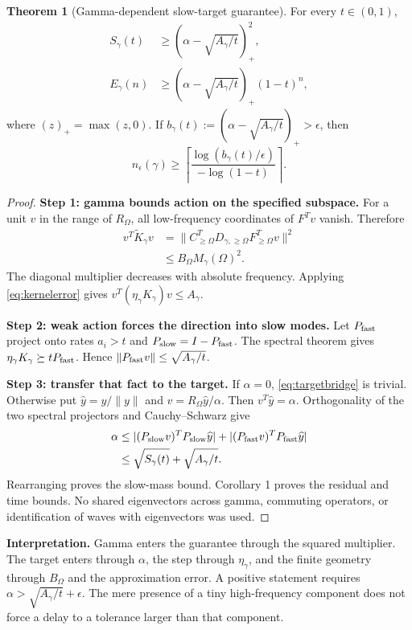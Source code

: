 \documentclass[11pt]{article}
\theoremstyle{definition}
\newtheorem{theorem}{Theorem}
\begin{document}
\begin{theorem}[Gamma-dependent slow-target guarantee]
For every $t\in(0,1)$,
\begin{equation}\label{eq:targetbridge}
 \boxed{\begin{aligned}
 S_\gamma(t)&\ge(\alpha-\sqrt{A_\gamma/t})_+^2,\\
 E_\gamma(n)&\ge(\alpha-\sqrt{A_\gamma/t})_+(1-t)^n,
 \end{aligned}}
\end{equation}
where $(z)_+=\max(z,0)$. If $b_\gamma(t):=(\alpha-\sqrt{A_\gamma/t})_+>\epsilon$,
then
\begin{equation}\label{eq:targettime}
 \boxed{n_\epsilon(\gamma)\ge\left\lceil
 \frac{\log(b_\gamma(t)/\epsilon)}{-\log(1-t)}\right\rceil.}
\end{equation}
\end{theorem}
\begin{proof}
\textbf{Step 1: gamma bounds action on the specified subspace.}
For a unit $v$ in the range of $R_\Omega$, all low-frequency coordinates of
$F^Tv$ vanish. Therefore
\begin{equation*}
 \begin{aligned}
 v^T\widetilde K_\gamma v
 &=\|C_{\ge\Omega}^TD_{\gamma,\ge\Omega}F_{\ge\Omega}^Tv\|^2\\
 &\le B_\Omega M_\gamma(\Omega)^2.
 \end{aligned}
\end{equation*}
The diagonal multiplier decreases with absolute frequency. Applying
\eqref{eq:kernelerror} gives $v^T(\eta_\gamma K_\gamma)v\le A_\gamma$.

\textbf{Step 2: weak action forces the direction into slow modes.}
Let $P_{\rm fast}$ project onto rates $a_i>t$ and
$P_{\rm slow}=I-P_{\rm fast}$. The spectral theorem gives
$\eta_\gamma K_\gamma\succeq tP_{\rm fast}$. Hence
$\|P_{\rm fast}v\|\le\sqrt{A_\gamma/t}$.

\textbf{Step 3: transfer that fact to the target.}
If $\alpha=0$, \eqref{eq:targetbridge} is trivial. Otherwise put
$\widehat y=y/\|y\|$ and $v=R_\Omega\widehat y/\alpha$.
Then $v^T\widehat y=\alpha$. Orthogonality of the two spectral projectors and
Cauchy--Schwarz give
\begin{equation*}
 \begin{aligned}
 \alpha&\le |(P_{\rm slow}v)^TP_{\rm slow}\widehat y|
       +|(P_{\rm fast}v)^TP_{\rm fast}\widehat y|\\
       &\le\sqrt{S_\gamma(t)}+\sqrt{A_\gamma/t}.
 \end{aligned}
\end{equation*}
Rearranging proves the slow-mass bound. Corollary 1 proves the residual and
time bounds. No shared eigenvectors across gamma, commuting operators, or
identification of waves with eigenvectors was used.
\end{proof}
\textbf{Interpretation.} Gamma enters the guarantee through the squared
multiplier. The target enters through $\alpha$, the step through
$\eta_\gamma$, and the finite geometry through $B_\Omega$ and the approximation
error. A positive statement requires $\alpha>\sqrt{A_\gamma/t}+\epsilon$.
The mere presence of a tiny high-frequency component does not force a delay
to a tolerance larger than that component.
\end{document}
